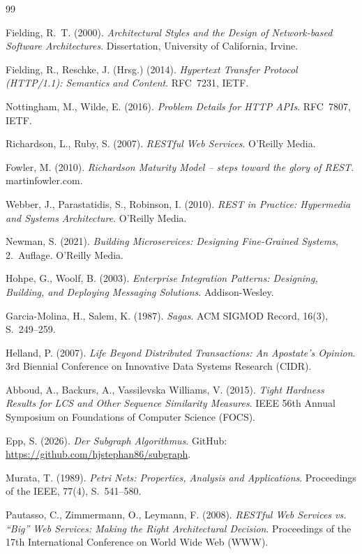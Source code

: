 ﻿\documentclass[a4paper,12pt]{article}
\theoremstyle{definition}
\begin{document}
\begin{thebibliography}{99}

Fielding, R.~T. (2000).
\emph{Architectural Styles and the Design of Network-based Software Architectures}.
Dissertation, University of California, Irvine.

Fielding, R., Reschke, J. (Hrsg.) (2014).
\emph{Hypertext Transfer Protocol (HTTP/1.1): Semantics and Content}.
RFC~7231, IETF.

Nottingham, M., Wilde, E. (2016).
\emph{Problem Details for HTTP APIs}.
RFC~7807, IETF.

Richardson, L., Ruby, S. (2007).
\emph{RESTful Web Services}.
O'Reilly Media.

Fowler, M. (2010).
\emph{Richardson Maturity Model -- steps toward the glory of REST}.
martinfowler.com.

Webber, J., Parastatidis, S., Robinson, I. (2010).
\emph{REST in Practice: Hypermedia and Systems Architecture}.
O'Reilly Media.

Newman, S. (2021).
\emph{Building Microservices: Designing Fine-Grained Systems}, 2.~Auflage.
O'Reilly Media.

Hohpe, G., Woolf, B. (2003).
\emph{Enterprise Integration Patterns: Designing, Building, and Deploying Messaging
Solutions}.
Addison-Wesley.

Garcia-Molina, H., Salem, K. (1987).
\emph{Sagas}.
ACM SIGMOD Record, 16(3), S.~249--259.

Helland, P. (2007).
\emph{Life Beyond Distributed Transactions: An Apostate's Opinion}.
3rd Biennial Conference on Innovative Data Systems Research (CIDR).

Abboud, A., Backurs, A., Vassilevska Williams, V. (2015).
\emph{Tight Hardness Results for LCS and Other Sequence Similarity Measures}.
IEEE 56th Annual Symposium on Foundations of Computer Science (FOCS).

Epp, S. (2026).
\emph{Der Subgraph Algorithmus}.
GitHub: \url{https://github.com/hjstephan86/subgraph}.

Murata, T. (1989).
\emph{Petri Nets: Properties, Analysis and Applications}.
Proceedings of the IEEE, 77(4), S.~541--580.

Pautasso, C., Zimmermann, O., Leymann, F. (2008).
\emph{RESTful Web Services vs. ``Big'' Web Services: Making the Right Architectural
Decision}.
Proceedings of the 17th International Conference on World Wide Web (WWW).

\end{thebibliography}
\end{document}
